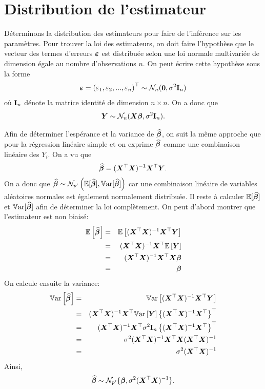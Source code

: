 
\section{Distribution de l'estimateur}

Déterminons la distribution des estimateurs pour faire de l'inférence sur les paramètres.  Pour trouver la loi des estimateurs, on doit faire l'hypothèse que le vecteur des termes d'erreurs $\bm\varepsilon$ est distribuée selon une loi normale multivariée de dimension égale au nombre d'observations $n$. 
On peut écrire cette hypothèse sous la forme
$$\bm\varepsilon=\left(\varepsilon_1,\varepsilon_2,...,\varepsilon_n\right)^\top \sim \mathcal{N}_n(\textbf{0}, \sigma^2\bold{I}_n)$$
où  $\bold{I}_n$ dénote la matrice identité de dimension $n\times n$.
On a donc que
\begin{eqnarray*}
	\bm{Y} \sim \mathcal{N}_n (\bm{X}\bm\beta, \sigma^2 \bold{I}_n).
\end{eqnarray*}

Afin de déterminer l'espérance et la variance de $\widehat{\bm\beta}$, on suit la même approche que pour la régression linéaire simple et on exprime $\widehat{\bm\beta}$ comme une combinaison linéaire des $Y_i$.
On a vu que
\begin{eqnarray*}
	\widehat{\bm\beta}=(\bm{X}^\top\bm{X})^{-1}\bm{X}^\top\bm{Y}.
\end{eqnarray*}
On a donc que $\widehat{\bm\beta} \sim \mathcal{N}_{p'}\left(\mathbb{E}[\widehat{\bm\beta}],\mathbb{V}\text{ar}[\widehat{\bm\beta}]\right)$ car une combinaison linéaire de variables aléatoires normales est également normalement distribuée. Il reste à calculer $\mathbb{E}[\widehat{\bm\beta}]$ et $\mathbb{V}\text{ar}[\widehat{\bm\beta}]$ afin de déterminer la loi complètement.
On peut d'abord montrer que l'estimateur est non biaisé:
\begin{eqnarray*}
	\mathbb{E}\left[\widehat{\bm\beta}\right]&=&\mathbb{E}\left[(\bm{X}^\top\bm{X})^{-1}\bm{X}^\top\bm{Y}\right] \\
	&=& (\bm{X}^\top\bm{X})^{-1}\bm{X}^\top \mathbb{E}\left[\bm{Y}\right]\\
	&=& (\bm{X}^\top\bm{X})^{-1}\bm{X}^\top \bm{X}\bm\beta\\
	&=& \bm\beta
\end{eqnarray*}
On calcule ensuite la variance:
\begin{eqnarray*}
	\mathbb{V}\text{ar}\left[\widehat{\bm\beta}\right]&=& \mathbb{V}\text{ar}\left[(\bm{X}^\top\bm{X})^{-1}\bm{X}^\top\bm{Y}\right]\\
	&=& (\bm{X}^\top\bm{X})^{-1}\bm{X}^\top \mathbb{V}\text{ar}\left[\bm{Y}\right] \left\{(\bm{X}^\top\bm{X})^{-1}\bm{X}^\top\right\}^\top\\
	&=& (\bm{X}^\top\bm{X})^{-1}\bm{X}^\top \sigma^2\bold{I}_n \left\{(\bm{X}^\top\bm{X})^{-1}\bm{X}^\top\right\}^\top\\
	&=& \sigma^2 (\bm{X}^\top\bm{X})^{-1} \bm{X}^\top \bm{X}(\bm{X}^\top\bm{X})^{-1}\\
	&=& \sigma^2 (\bm{X}^\top\bm{X})^{-1}
\end{eqnarray*}
Ainsi,
\begin{eqnarray}
	\widehat{\bm\beta} \sim \mathcal{N}_{p'}\{\bm\beta,\sigma^2 (\bm{X}^\top\bm{X})^{-1}\}.
	\label{loibeta}
\end{eqnarray}

